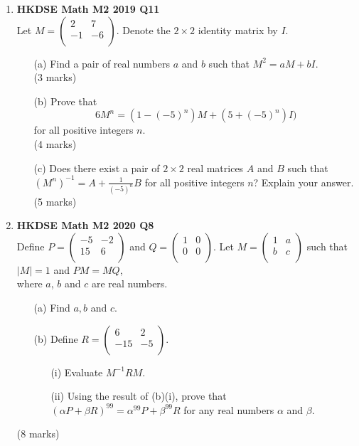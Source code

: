 \documentclass{report}
\begin{document}
\begin{enumerate}
	\item \textbf{HKDSE Math M2 2019 Q11}\\
	Let $M = \begin{pmatrix}
		2 &7 \\
		-1&-6\\
	\end{pmatrix}$. Denote the $2 \times2$ identity matrix by $I$. 
	\begin{enumerate}
		\item[(a)]Find a pair of real numbers $a$ and $b$ such that $M^2 = aM + bI$. \\(3 marks) 
		\item[(b)]
		Prove that $$6M^n = (1-(-5)^n)M+(5+(-5)^n)I)$$ for all positive integers $n$. \\(4 marks)
		\item[(c)]Does there exist a pair of $2\times2$ real matrices $A$ and $B$ such that $(M^n)^{-1} = A +\displaystyle \frac{1}{(-5)^n}B$ for all positive integers $n$? Explain your answer. \\(5 marks)
	\end{enumerate}

	\item \textbf{HKDSE Math M2 2020 Q8}\\
	Define $P = \begin{pmatrix}
				-5&-2\\
				15&6\\
				\end{pmatrix}$ and $Q = 
				\begin{pmatrix}
				1&0\\
				0&0\\
				\end{pmatrix}$. Let $M = 
				\begin{pmatrix}
				1&a\\
				b&c\\
			\end{pmatrix}$ such that $|M| = 1$ and $PM = MQ$, \\
	where $a$, $b$ and $c$ are real numbers.
	\begin{enumerate}
		\item [(a)] Find $a,b$ and $c$. 
		\item [(b)] Define $R = 
				\begin{pmatrix}
				6&2\\
				-15&-5\\
				\end{pmatrix}$. 
		\begin{enumerate}
			\item [(i)]Evaluate $M^{-1}RM$. 
			\item [(ii)]Using the result of (b)(i), prove that $(\alpha P + \beta R)^{99} = \alpha^{99}P+\beta ^{99}R$ for any real numbers $\alpha$ and $\beta$. 
		\end{enumerate} 
	\end{enumerate}
	(8 marks)


\end{enumerate}
\end{document}
